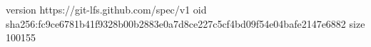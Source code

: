version https://git-lfs.github.com/spec/v1
oid sha256:fc9ce6781b41f9328b00b2883e0a7d8ce227c5cf4bd09f54e04bafe2147e6882
size 100155
